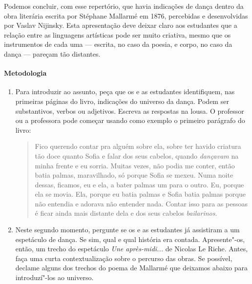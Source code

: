 \documentclass[12pt]{extarticle}
\begin{document}
Podemos concluir, com esse repertório, que havia indicações de dança dentro da
obra literária escrita por Stéphane Mallarmé em 1876, percebidas e desenvolvidas
por Vaslav Nijinsky. Esta apresentação deve deixar
claro aos estudantes que a relação entre as linguagens artísticas pode
ser muito criativa, mesmo que os instrumentos de cada uma --- escrita, no caso
da poesia, e corpo, no caso da dança --- pareçam tão distantes.

\paragraph{Metodologia}

\begin{enumerate}

  \item
  Para introduzir ao assunto, peça que os e as estudantes identifiquem, nas primeiras
  páginas do livro, indicações do universo da dança. Podem ser substantivos, verbos ou adjetivos. 
  Escreva as respostas na lousa. O professor ou a professora pode começar usando como exemplo
  o primeiro parágrafo do livro:

  \begin{quote}
  Fico querendo contar pra alguém sobre ela,
sobre ter havido criatura tão doce quanto Sofia e falar
dos seus cabelos, quando \emph{dançavam} na minha frente e
eu sorria. Muitas vezes, não podia me conter, então batia
palmas, maravilhado, só porque Sofia se mexeu. Numa
noite dessas, ficamos, eu e ela, a bater palmas um para o
outro. Eu, porque ela se movia. Ela, porque eu batia palmas e 
Sofia batia palmas porque não entendia e adorava
não entender nada. Contar isso para as pessoas é ficar ainda 
mais distante dela e dos seus cabelos \emph{bailarinos}.
\end{quote}


  \item
  Neste segundo momento, pergunte se os e as estudantes já assistiram a um
  espetáculo de dança. Se sim, qual e qual história era contada. 
  Apresente"-os, então, um trecho do espetáculo \textit{Une après-midi...}
  de Nicolas Le Riche. Antes, faça uma curta 
  contextualização sobre o percurso das obras. Se possível, declame
  alguns dos trechos do poema de Mallarmé que deixamos abaixo para introduzí"-los
  ao universo. 





\end{enumerate}
\end{document}
